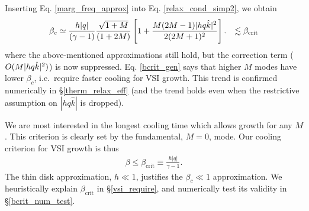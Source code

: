 Inserting Eq. \ref{marg_freq_approx} into
Eq. \ref{relax_cond_simp2}, we obtain 
\begin{align}\label{bcrit_gen}
  \beta_c &\simeq  \frac{h|q|}{(\gamma - 1)}
  \frac{\sqrt{1+M}}{(1+2M)}
  \left[1 + \frac{M(2M-1)|h q   \khat|^2}{2(2M+1)^2}\right].
  &\lesssim \beta_\mathrm{crit}%
\end{align}
where the above-mentioned approximations still hold, but the correction term ($O(M |h q \hat{k}|^2)$) is now suppressed.
Eq. \ref{bcrit_gen} says that higher $M$ modes have lower $\beta_c$, i.e.\ require faster cooling for VSI growth.
This trend is confirmed numerically in \S\ref{therm_relax_eff} (and the trend holds even when the restrictive assumption
on $|h q \hat{k}|$ is dropped). 

We are most interested in the longest cooling time which allows growth for any $M$.  
This criterion is clearly set by the fundamental, $M = 0$, mode.  Our cooling criterion for 
VSI growth is thus 
 \begin{align}\label{iso_vsi_cond}
  \beta\leq \beta_\mathrm{crit}  \equiv
  \frac{h|q|}{\gamma-1} . 
\end{align}
The thin disk approximation, $h \ll 1$, justifies the $\beta_c \ll 1$ approximation.
 We heuristically explain $\beta_\mathrm{crit}$ in
\S\ref{vsi_require}, and numerically test its validity in \S\ref{bcrit_num_test}. 




